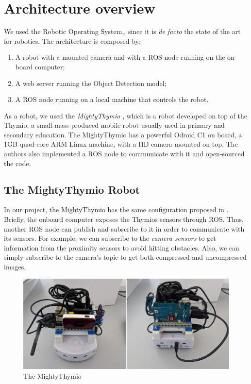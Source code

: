 \documentclass[letterpaper, 10 pt, conference]{ieeeconf}  %
\begin{document}
\section{Architecture overview}
We used the Robotic Operating System,\cite{ROS}, since it is \emph{de facto} the state of the art for robotics. The architecture is composed by:
\begin{enumerate}
	\item A robot with a mounted camera and with a ROS node running on the on-board computer;
	\item A web server running the Object Detection model;
	\item A ROS node running on a local machine that controls the robot.
\end{enumerate}
As a robot, we used the \emph{MightyThymio} \cite{guzzi2018eaai}, which is a robot developed on top of the Thymio, a small mass-produced mobile robot usually used in primary and secondary education. The MightyThymio has a powerful Odroid C1 on board, a 1GB quad-core ARM Linux machine, with a HD camera mounted on top. The authors also implemented a ROS node to communicate with it and open-sourced the code.

\subsection*{The MightyThymio Robot}

In our project, the MightyThymio has the same configuration proposed in \cite{guzzi2018eaai}. Briefly, the onboard computer exposes the Thymios sensors through ROS. Thus, another ROS node can publish and subscribe to it in order to communicate with its sensors. For example, we can subscribe to the \emph{camera sensors} to get information from the proximity sensors to avoid hitting obstacles. Also, we can simply subscribe to the camera's topic to get both compressed and uncompressed images. 
\begin{figure}[H]
\centering
\includegraphics[width=\linewidth]{assembled_myt}	
\caption{The MightyThymio}
\end{figure}
\end{document}
